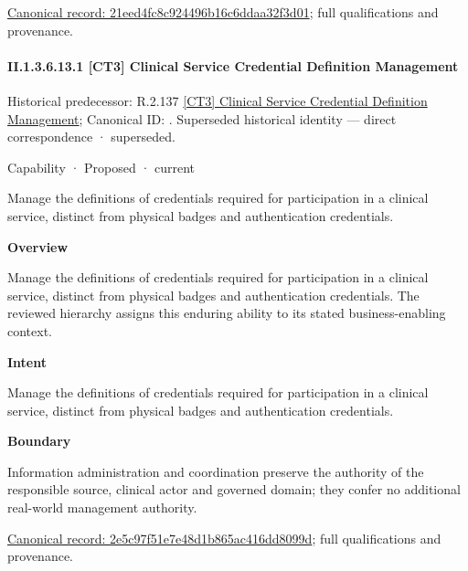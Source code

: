 {\footnotesize \href{../../../../continuum/strategy/capability/21eed4fc8c924496b16c6ddaa32f3d01.md}{Canonical record: 21eed4fc8c924496b16c6ddaa32f3d01}; full qualifications and provenance.}\par
\paragraph*{II.1.3.6.13.1 [CT3] Clinical Service Credential Definition Management}
\label{navigation:II.1.3.6.13.1}

{\small Historical predecessor: R.2.137 \hyperref[element:0115ed50867d468a95c0fafa1c5d79e2]{[CT3] Clinical Service Credential Definition Management}; Canonical ID: \texttt{}. Superseded historical identity — direct correspondence · superseded.}\par
\label{element:2e5c97f51e7e48d1b865ac416dd8099d}
{\small Capability · Proposed · current}\par

Manage the definitions of credentials required for participation in a clinical service, distinct from physical badges and authentication credentials.



\textbf{Overview}



Manage the definitions of credentials required for participation in a clinical service, distinct from physical badges and authentication credentials. The reviewed hierarchy assigns this enduring ability to its stated business-enabling context.



\textbf{Intent}



Manage the definitions of credentials required for participation in a clinical service, distinct from physical badges and authentication credentials.



\textbf{Boundary}



Information administration and coordination preserve the authority of the responsible source, clinical actor and governed domain; they confer no additional real-world management authority.


{\footnotesize \href{../../../../continuum/strategy/capability/2e5c97f51e7e48d1b865ac416dd8099d.md}{Canonical record: 2e5c97f51e7e48d1b865ac416dd8099d}; full qualifications and provenance.}\par
